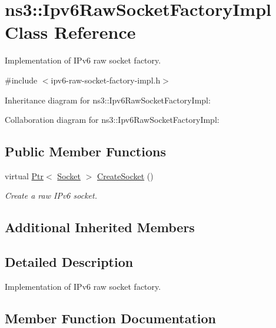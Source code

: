 \hypertarget{classns3_1_1Ipv6RawSocketFactoryImpl}{}\section{ns3\+:\+:Ipv6\+Raw\+Socket\+Factory\+Impl Class Reference}
\label{classns3_1_1Ipv6RawSocketFactoryImpl}


Implementation of I\+Pv6 raw socket factory.  




{\ttfamily \#include $<$ipv6-\/raw-\/socket-\/factory-\/impl.\+h$>$}



Inheritance diagram for ns3\+:\+:Ipv6\+Raw\+Socket\+Factory\+Impl\+:


Collaboration diagram for ns3\+:\+:Ipv6\+Raw\+Socket\+Factory\+Impl\+:
\subsection*{Public Member Functions}
\begin{DoxyCompactItemize}
\item 
virtual \hyperlink{classns3_1_1Ptr}{Ptr}$<$ \hyperlink{classns3_1_1Socket}{Socket} $>$ \hyperlink{classns3_1_1Ipv6RawSocketFactoryImpl_a2d3eeef22acd1ebb156402d10a1fc287}{Create\+Socket} ()
\begin{DoxyCompactList}\small\item\em Create a raw I\+Pv6 socket. \end{DoxyCompactList}\end{DoxyCompactItemize}
\subsection*{Additional Inherited Members}


\subsection{Detailed Description}
Implementation of I\+Pv6 raw socket factory. 

\subsection{Member Function Documentation}
